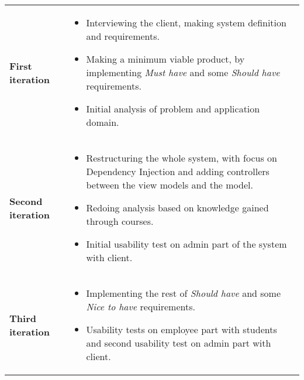 \begin{longtable}{p{3.2cm} p{10cm}}
    \renewcommand{\arraystretch}{2.0}
        \\
        \hline
        \textbf{First iteration} & 
        \vspace*{-7mm}
        \begin{itemize} \itemsep0em
        
            \item Interviewing the client, making system definition and requirements.
            
            \item Making a minimum viable product, by implementing \textit{Must have} and some \textit{Should have} requirements.
            
            \item Initial analysis of problem and application domain.
            
        \end{itemize}
        \\
        \hline
        
        \textbf{Second iteration} & 
        \vspace*{-7mm}
        \begin{itemize} \itemsep0em 
            
            \item Restructuring the whole system, with focus on Dependency Injection and adding controllers between the view models and the model.
            
            \item Redoing analysis based on knowledge gained through courses.
            
            \item Initial usability test on admin part of the system with client.
            
        \end{itemize}
        \\
        \hline
        
        \textbf{Third iteration} &     
        \vspace*{-7mm}
        \begin{itemize} \itemsep0em 
        
            \item Implementing the rest of \textit{Should have} and some \textit{Nice to have} requirements.
            
            \item Usability tests on employee part with students and second usability test on admin part with client.
            

\end{itemize}
\end{longtable}

